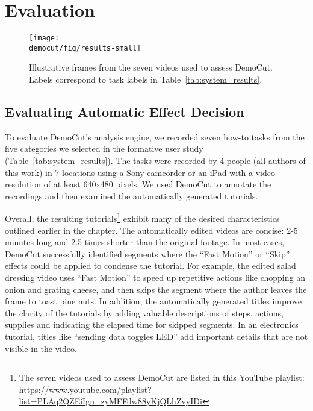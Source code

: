 \section{Evaluation}

\begin{figure}[t]
  \centering
  \texttt{[image: \\democut/fig/results-small]}
  \caption{Illustrative frames from the seven videos used to assess DemoCut. Labels correspond to task labels in Table~\ref{tab:system_results}.}
  \label{fig:results}
  \vspace{-0.2in}
\end{figure}

\subsection{Evaluating Automatic Effect Decision}

To evaluate DemoCut's analysis engine, we recorded seven how-to tasks
from the five categories we selected in the formative user study
(Table~\ref{tab:system_results}).
%
The tasks were recorded by 4 people (all authors of this
work) in 7 locations using a Sony camcorder or an iPad with
a video resolution of at least 640x480 pixels.
%
We used DemoCut to annotate the recordings and then examined the
automatically generated tutorials.

Overall, the resulting tutorials\footnote{The seven videos used to assess DemoCut are listed in this YouTube playlist:\\\url{https://www.youtube.com/playlist?list=PLAq2QZEiIgn_zyMFFdw88yKjQLhZvyIDi}
} exhibit many of the desired
characteristics outlined earlier in the chapter.
%
The automatically edited videos are concise: 2-5 minutes long and 2.5
times shorter than the original footage.
%
In most cases, DemoCut successfully identified segments where the ``Fast
Motion'' or ``Skip'' effects could be applied to condense the tutorial.
%
For example, the edited salad dressing video uses ``Fast Motion'' to
speed up repetitive actions like chopping an onion and grating cheese,
and then skips the segment where the author leaves the frame to toast
pine nuts.
%
In addition, the automatically generated titles improve the clarity of
the tutorials by adding valuable descriptions of steps, actions,
supplies and indicating the elapsed time for skipped segments.
%
In an electronics tutorial, titles like ``sending data toggles LED''
add important details that are not visible in the video.

